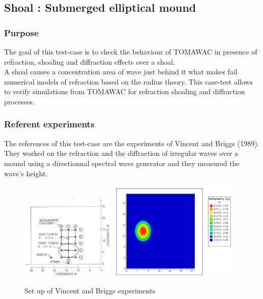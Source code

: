 \subsection{Shoal : Submerged elliptical mound}
%

%    
\subsubsection{Purpose}
The goal of this test-case is to check the behaviour of TOMAWAC in presence of refraction, shoaling and diffraction effects over a shoal.\\
A shoal causes a concentration area of wave just behind it what makes fail numerical models of refraction based on the radius theory. This case-test allows to verify simulations from TOMAWAC for refraction shoaling and diffraction processes.

\subsubsection{Referent experiments}
The references of this test-case are the experiments of Vincent and Briggs (1989). They worked on the refraction and the diffraction of irregular waves over a mound using a directionnal spectral wave generator and they measured the wave's height.\\

\begin{figure}[h!]
  \centering
    \includegraphics[width=0.4\textwidth]{setup.jpg}
      \includegraphics[width=0.55\textwidth]{bathy_shoal.jpg}
      \caption{Set up of Vincent and Briggs experiments}
\end{figure}

